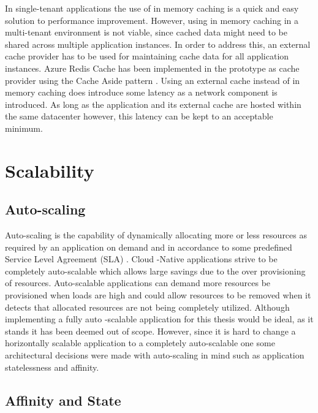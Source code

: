 In single-tenant applications the use of in memory caching is a quick and easy solution to performance improvement. However, using in memory caching in a multi-tenant environment is not viable, since cached data might need to be shared across multiple application instances. In order to address this, an external cache provider has to be used for maintaining cache data for all application instances. Azure Redis Cache has been implemented in the prototype as cache provider using the Cache Aside pattern \cite{Swanson}. Using an external cache instead of in memory caching does introduce some latency as a network component is introduced. As long as the application and its external cache are hosted within the same datacenter however, this latency can be kept to an acceptable minimum.


\section{Scalability}


\subsection{Auto-scaling}

Auto-scaling is the capability of dynamically allocating more or less resources as required by an application on demand and in accordance to some predefined Service Level Agreement (SLA) \cite{Swanson}. Cloud -Native applications strive to be completely auto-scalable which allows large savings due to the over provisioning of resources. Auto-scalable applications can demand more resources be provisioned when loads are high and could allow resources to be removed when it detects that allocated resources are not being completely utilized. Although implementing a fully auto -scalable application for this thesis would be ideal, as it stands it has been deemed out of scope. However, since it is hard to change a horizontally scalable application to a completely auto-scalable one some architectural decisions were made with auto-scaling in mind such as application statelessness and affinity.


\subsection{Affinity and State}

